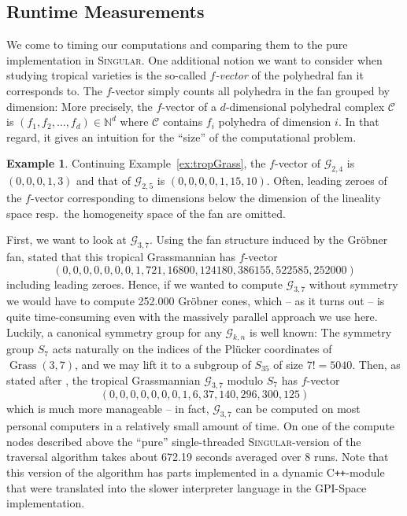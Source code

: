 \documentclass[
  paper=a4,
  titlepage,
  bibliography=totoc,
  pagesize=pdftex
]{scrartcl}
\numberwithin{figure}{section}
\numberwithin{equation}{section}
\numberwithin{table}{section}
\newcommand*\setN{\mathds{N}}
\newcommand{\Cpp}{C\nolinebreak\texttt{++}}
\DeclareMathOperator{\Grass}{Grass}
\theoremstyle{definition}
\newtheorem{example}[definition]{Example}
\numberwithin{definition}{section}
\begin{document}
\subsection{Runtime Measurements}

We come to timing our computations and comparing them to the pure implementation in
\textsc{Singular}. One additional notion we want to consider when studying tropical
varieties is the so-called \emph{$f$-vector} of the polyhedral fan it corresponds to. The
$f$-vector simply counts all polyhedra in the fan grouped by dimension: More precisely,
the $f$-vector of a $d$-dimensional polyhedral complex $\mathcal C$ is $(f_1, f_2, \dots,
f_d) \in \setN^d$ where $\mathcal C$ contains $f_i$ polyhedra of dimension $i$. In that
regard, it gives an intuition for the \enquote{size} of the computational problem.

\begin{example} \label{ex:fVec}
  Continuing Example~\ref{ex:tropGrass}, the $f$-vector of $\mathcal G_{2,4}$ is
  $(0,0,0,1,3)$ and that of $\mathcal G_{2,5}$ is $(0,0,0,0,1,15,10)$. Often, leading
  zeroes of the $f$-vector corresponding to dimensions below the dimension of the
  lineality space resp.\ the homogeneity space of the fan are omitted.
\end{example}

First, we want to look at $\mathcal G_{3,7}$. Using the fan structure induced by the
Gröbner fan, \cite[Theorem~2.1]{tropPlane} stated that this tropical Grassmannian has
$f$-vector
\[
  (0,0,0,0,0,0,0,1,721,16800,124180,386155,522585,252000)
\]
including leading zeroes. Hence, if we wanted to compute $\mathcal G_{3,7}$ without
symmetry we would have to compute 252.000 Gröbner cones, which -- as it turns out -- is
quite time-consuming even with the massively parallel approach we use here. Luckily, a
canonical symmetry group for any $\mathcal G_{k,n}$ is well known: The symmetry group
$S_7$ acts naturally on the indices of the Plücker coordinates of $\Grass(3,7)$, and we
may lift it to a subgroup of $S_{35}$ of size $7! = 5040$. Then, as stated after
\cite[Theorem~2.2]{tropPlane}, the tropical Grassmannian $\mathcal G_{3,7}$ modulo $S_7$
has $f$-vector
\[
  (0,0,0,0,0,0,0,1,6,37,140,296,300,125)
\]
which is much more manageable -- in fact, $\mathcal G_{3,7}$ can be computed on most
personal computers in a relatively small amount of time. On one of the compute nodes
described above the \enquote{pure} single-threaded \textsc{Singular}-version of the
traversal algorithm takes about {672.19} seconds averaged over 8 runs. Note that this
version of the algorithm has parts implemented in a dynamic \Cpp-module that were
translated into the slower  interpreter language in the GPI-Space
implementation.
\end{document}
